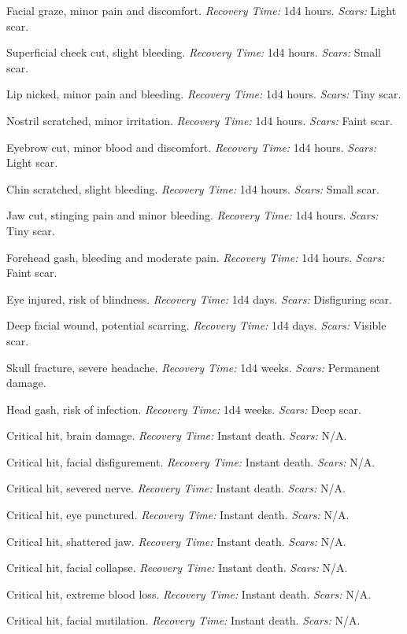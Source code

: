 \documentclass[12pt]{book}  %
\begin{document}
\begin{description}[labelwidth=1.5em, leftmargin=*, itemsep=0.4em]
    \item[1 -] Facial graze, minor pain and discomfort. \textit{Recovery Time:} 1d4 hours. \textit{Scars:} Light scar.
    \item[2 -] Superficial cheek cut, slight bleeding. \textit{Recovery Time:} 1d4 hours. \textit{Scars:} Small scar.
    \item[3 -] Lip nicked, minor pain and bleeding. \textit{Recovery Time:} 1d4 hours. \textit{Scars:} Tiny scar.
    \item[4 -] Nostril scratched, minor irritation. \textit{Recovery Time:} 1d4 hours. \textit{Scars:} Faint scar.
    \item[5 -] Eyebrow cut, minor blood and discomfort. \textit{Recovery Time:} 1d4 hours. \textit{Scars:} Light scar.
    \item[6 -] Chin scratched, slight bleeding. \textit{Recovery Time:} 1d4 hours. \textit{Scars:} Small scar.
    \item[7 -] Jaw cut, stinging pain and minor bleeding. \textit{Recovery Time:} 1d4 hours. \textit{Scars:} Tiny scar.
    \item[8 -] Forehead gash, bleeding and moderate pain. \textit{Recovery Time:} 1d4 hours. \textit{Scars:} Faint scar.
    \item[9 -] Eye injured, risk of blindness. \textit{Recovery Time:} 1d4 days. \textit{Scars:} Disfiguring scar.
    \item[10 -] Deep facial wound, potential scarring. \textit{Recovery Time:} 1d4 days. \textit{Scars:} Visible scar.
    \item[11 -] Skull fracture, severe headache. \textit{Recovery Time:} 1d4 weeks. \textit{Scars:} Permanent damage.
    \item[12 -] Head gash, risk of infection. \textit{Recovery Time:} 1d4 weeks. \textit{Scars:} Deep scar.
    \item[13 -] Critical hit, brain damage. \textit{Recovery Time:} Instant death. \textit{Scars:} N/A.
    \item[14 -] Critical hit, facial disfigurement. \textit{Recovery Time:} Instant death. \textit{Scars:} N/A.
    \item[15 -] Critical hit, severed nerve. \textit{Recovery Time:} Instant death. \textit{Scars:} N/A.
    \item[16 -] Critical hit, eye punctured. \textit{Recovery Time:} Instant death. \textit{Scars:} N/A.
    \item[17 -] Critical hit, shattered jaw. \textit{Recovery Time:} Instant death. \textit{Scars:} N/A.
    \item[18 -] Critical hit, facial collapse. \textit{Recovery Time:} Instant death. \textit{Scars:} N/A.
    \item[19 -] Critical hit, extreme blood loss. \textit{Recovery Time:} Instant death. \textit{Scars:} N/A.
    \item[20 -] Critical hit, facial mutilation. \textit{Recovery Time:} Instant death. \textit{Scars:} N/A.
\end{description}
\end{document}
